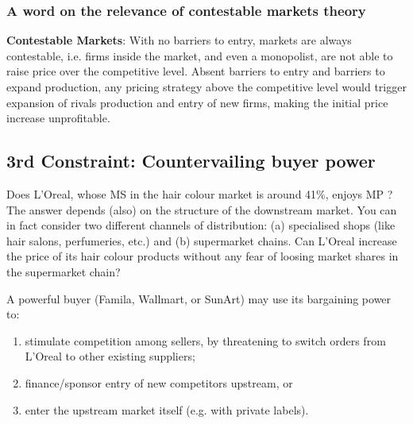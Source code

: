         \subsubsection{A word on the relevance of contestable markets theory}

        \textbf{Contestable Markets}: With no barriers to entry, markets are always contestable, i.e. firms inside the market, and even a monopolist, are not able to raise price over the competitive level. Absent barriers to entry and barriers to expand production, any pricing strategy above the competitive level would trigger expansion of rivals production and entry of new firms, making the initial price increase unprofitable.


\newpage
    \subsection{3rd Constraint: Countervailing buyer power}


        Does L’Oreal, whose MS in the hair colour market is around 41\%, enjoys MP ? The answer depends (also) on the structure of the downstream market. You can in fact consider two different channels of distribution: (a) specialised shops (like hair salons, perfumeries, etc.) and (b) supermarket chains. Can L’Oreal increase the price of its hair colour products without any fear of loosing market shares in the supermarket chain?

        A powerful buyer (Famila, Wallmart, or SunArt) may use its bargaining power to: 
        \begin{enumerate}
            \item stimulate competition among sellers, by threatening to switch orders from L’Oreal to other existing suppliers;
            \item finance/sponsor entry of new competitors upstream, or 
            \item enter the upstream market itself (e.g. with private labels). 
        \end{enumerate}


